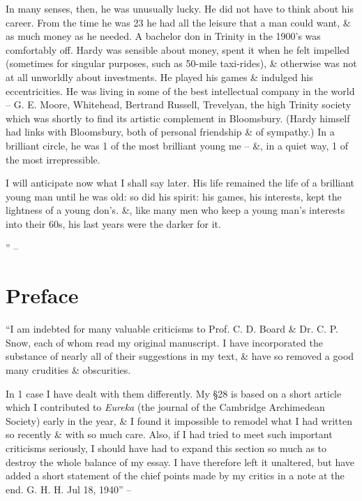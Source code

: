 \documentclass{article}
\numberwithin{equation}{section}
\begin{document}
In many senses, then, he was unusually lucky. He did not have to think about his career. From the time he was 23 he had all the leisure that a man could want, \& as much money as he needed. A bachelor don in Trinity in the 1900's was comfortably off. Hardy was sensible about money, spent it when he felt impelled (sometimes for singular purposes, such as 50-mile taxi-rides), \& otherwise was not at all unworldly about investments. He played his games \& indulged his eccentricities. He was living in some of the best intellectual company in the world -- G. E. Moore, Whitehead, Bertrand Russell, Trevelyan, the high Trinity society which was shortly to find its artistic complement in Bloomsbury. (Hardy himself had links with Bloomsbury, both of personal friendship \& of sympathy.) In a brilliant circle, he was 1 of the most brilliant young me -- \&, in a quiet way, 1 of the most irrepressible.

I will anticipate now what I shall say later. His life remained the life of a brilliant young man until he was old: so did his spirit: his games, his interests, kept the lightness of a young don's. \&, like many men who keep a young man's interests into their 60s, his last years were the darker for it.

'' -- \cite[pp. 9--]{Hardy1992}


\section{Preface}
``I am indebted for many valuable criticisms to Prof. C. D. Board \& Dr. C. P. Snow, each of whom read my original manuscript. I have incorporated the substance of nearly all of their suggestions in my text, \& have so removed a good many crudities \& obscurities.

In 1 case I have dealt with them differently. My \S28 is based on a short article which I contributed to \textit{Eureka} (the journal of the Cambridge Archimedean Society) early in the year, \& I found it impossible to remodel what I had written so recently \& with so much care. Also, if I had tried to meet such important criticisms seriously, I should have had to expand this section so much as to destroy the whole balance of my essay. I have therefore left it unaltered, but have added a short statement of the chief points made by my critics in a note at the end. G. H. H. Jul 18, 1940'' -- \cite[p. 59]{Hardy1992}
\end{document}
